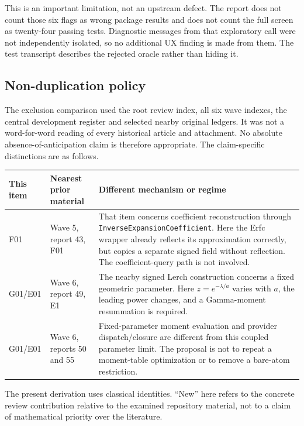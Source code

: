 \documentclass[11pt,a4paper]{article}
\newcommand{\code}[1]{\nolinkurl{#1}}
\begin{document}
This is an important limitation, not an upstream defect. The report does not
count those six flags as wrong package results and does not count the full
screen as twenty-four passing tests. Diagnostic messages from that exploratory
call were not independently isolated, so no additional UX finding is made from
them. The test transcript describes the rejected oracle rather than hiding it.

\subsection{Non-duplication policy}

The exclusion comparison used the root review index, all six wave indexes,
the central development register and selected nearby original ledgers.
It was not a word-for-word reading of every historical article and attachment.
No absolute absence-of-anticipation claim is therefore appropriate. The
claim-specific distinctions are as follows.\cite{reviewindex,status}

\begin{longtable}{@{}p{}p{}p{}@{}}
\toprule
This item & Nearest prior material & Different mechanism or regime\\
\midrule\endhead
F01 & Wave 5, report 43, F01 & That item concerns coefficient reconstruction
through \code{InverseExpansionCoefficient}. Here the Erfc wrapper already
reflects its approximation correctly, but copies a separate signed field
without reflection. The coefficient-query path is not involved.\\[7pt]
G01/E01 & Wave 6, report 49, E1 & The nearby signed Lerch construction concerns
a fixed geometric parameter. Here $z=e^{-\lambda/a}$ varies with $a$, the
leading power changes, and a Gamma-moment resummation is required.\\[7pt]
G01/E01 & Wave 6, reports 50 and 55 & Fixed-parameter moment evaluation and
provider dispatch/closure are different from this coupled parameter limit.
The proposal is not to repeat a moment-table optimization or to remove a
bare-atom restriction.\\
\bottomrule
\end{longtable}

The present derivation uses classical identities. ``New'' here refers to the
concrete review contribution relative to the examined repository material,
not to a claim of mathematical priority over the literature.
\cite{review43,review49}
\end{document}
